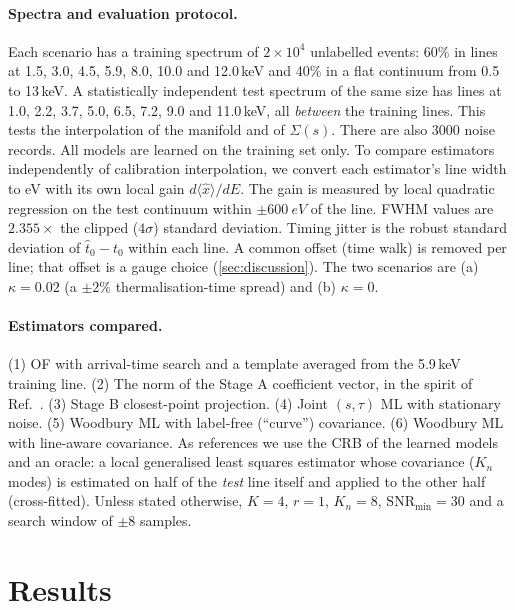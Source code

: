 \documentclass[aps,prapplied,reprint,superscriptaddress,longbibliography,nofootinbib]{revtex4-2}
\theoremstyle{remark}
\begin{document}
\paragraph{Spectra and evaluation protocol.} Each scenario has a training spectrum
of $2\times10^4$ unlabelled events: 60\% in lines at 1.5, 3.0, 4.5, 5.9, 8.0, 10.0
and 12.0\,keV and 40\% in a flat continuum from 0.5 to 13\,keV. A statistically
independent test spectrum of the same size has lines at 1.0, 2.2, 3.7, 5.0, 6.5,
7.2, 9.0 and 11.0\,keV, all \emph{between} the training lines. This tests the
interpolation of the manifold and of $\Sigma(s)$. There are also $3000$ noise
records. All models are learned on the training set only. To compare estimators
independently of calibration interpolation, we convert each estimator's line width
to eV with its own local gain $d\langle\hat x\rangle/dE$. The gain is measured by
local quadratic regression on the test continuum within $\pm\SI{600}{eV}$ of the
line. FWHM values are $2.355\times$ the clipped ($4\sigma$) standard deviation.
Timing jitter is the robust standard deviation of $\hat t_0-t_0$ within each line.
A common offset (time walk) is removed per line; that offset is a gauge choice
(\cref{sec:discussion}). The two scenarios are (a) $\kappa=0.02$ (a $\pm2\%$
thermalisation-time spread) and (b) $\kappa=0$.

\paragraph{Estimators compared.} (1) OF with arrival-time search and a template
averaged from the 5.9\,keV training line. (2) The norm of the Stage A coefficient
vector, in the spirit of Ref.~\cite{Yu2019}. (3) Stage B closest-point projection.
(4) Joint $(s,\tau)$ ML with stationary noise. (5) Woodbury ML with label-free
(``curve'') covariance. (6) Woodbury ML with line-aware covariance. As references
we use the CRB of the learned models and an oracle: a local generalised least
squares estimator whose covariance ($K_n$ modes) is estimated on half of the
\emph{test} line itself and applied to the other half (cross-fitted). Unless
stated otherwise, $K=4$, $r=1$, $K_n=8$, $\mathrm{SNR}_{\min}=30$ and a search
window of $\pm8$ samples.

\section{Results}
\label{sec:results}
\end{document}
